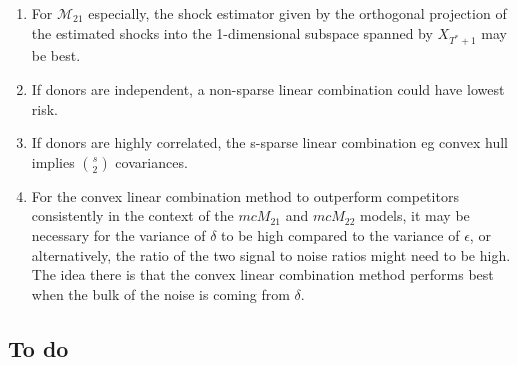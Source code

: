 \documentclass[11pt]{article}
\def\mc#1{\mathcal{#1}} %
\def\mc#1{\mathcal{#1}}
\theoremstyle{definition}
\begin{document}
\begin{enumerate}
\item For $\mc{M}_21$ especially, the shock estimator given by the orthogonal projection of the estimated shocks into the 1-dimensional subspace spanned by $X_{T^{*}+1}$ may be best.
\item  If donors are independent, a non-sparse linear combination could have lowest risk.
\item If donors are highly correlated, the s-sparse linear combination eg convex hull implies $s \choose 2$ covariances.
\item For the convex linear combination method to outperform competitors consistently in the context of the $mc{M}_{21}$ and $mc{M}_{22}$ models, it may be necessary for the variance of $\delta$ to be high compared to the variance of $\epsilon$, or alternatively, the ratio of the two signal to noise ratios might need to be high.  The idea there is that the convex linear combination method performs best when the bulk of the noise is coming from $\delta.$
\end{enumerate}

\subsection{To do}
\end{document}
